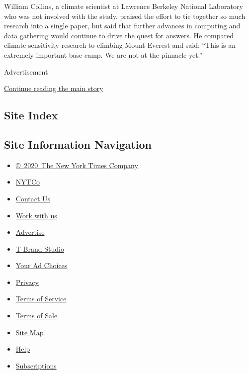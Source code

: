 William Collins, a climate scientist at Lawrence Berkeley National
Laboratory who was not involved with the study, praised the effort to
tie together so much research into a single paper, but said that further
advances in computing and data gathering would continue to drive the
quest for answers. He compared climate sensitivity research to climbing
Mount Everest and said: ``This is an extremely important base camp. We
are not at the pinnacle yet.''

Advertisement

\protect\hyperlink{after-bottom}{Continue reading the main story}

\hypertarget{site-index}{%
\subsection{Site Index}\label{site-index}}

\hypertarget{site-information-navigation}{%
\subsection{Site Information
Navigation}\label{site-information-navigation}}

\begin{itemize}
\tightlist
\item
  \href{https://help.nytimes3xbfgragh.onion/hc/en-us/articles/115014792127-Copyright-notice}{©~2020~The
  New York Times Company}
\end{itemize}

\begin{itemize}
\tightlist
\item
  \href{https://www.nytco.com/}{NYTCo}
\item
  \href{https://help.nytimes3xbfgragh.onion/hc/en-us/articles/115015385887-Contact-Us}{Contact
  Us}
\item
  \href{https://www.nytco.com/careers/}{Work with us}
\item
  \href{https://nytmediakit.com/}{Advertise}
\item
  \href{http://www.tbrandstudio.com/}{T Brand Studio}
\item
  \href{https://www.nytimes3xbfgragh.onion/privacy/cookie-policy\#how-do-i-manage-trackers}{Your
  Ad Choices}
\item
  \href{https://www.nytimes3xbfgragh.onion/privacy}{Privacy}
\item
  \href{https://help.nytimes3xbfgragh.onion/hc/en-us/articles/115014893428-Terms-of-service}{Terms
  of Service}
\item
  \href{https://help.nytimes3xbfgragh.onion/hc/en-us/articles/115014893968-Terms-of-sale}{Terms
  of Sale}
\item
  \href{https://spiderbites.nytimes3xbfgragh.onion}{Site Map}
\item
  \href{https://help.nytimes3xbfgragh.onion/hc/en-us}{Help}
\item
  \href{https://www.nytimes3xbfgragh.onion/subscription?campaignId=37WXW}{Subscriptions}
\end{itemize}
